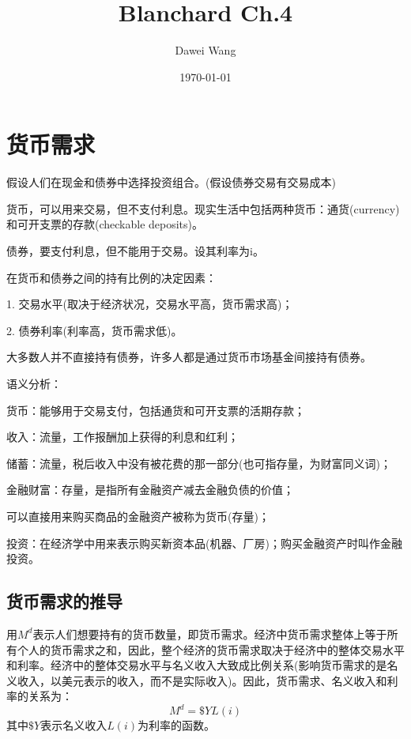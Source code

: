 \documentclass{article}
\title{Blanchard Ch.4}
\author{Dawei Wang}
\date{\today}
\begin{document}
	\maketitle
\section{货币需求}
假设人们在现金和债券中选择投资组合。(假设债券交易有交易成本)
\hspace*{\fill}

货币，可以用来交易，但不支付利息。现实生活中包括两种货币：通货(currency)和可开支票的存款(checkable deposits)。

债券，要支付利息，但不能用于交易。设其利率为i。

\hspace*{\fill}

在货币和债券之间的持有比例的决定因素：

1. 交易水平(取决于经济状况，交易水平高，货币需求高)；

2. 债券利率(利率高，货币需求低)。

\hspace*{\fill}

大多数人并不直接持有债券，许多人都是通过货币市场基金间接持有债券。

\hspace*{\fill}

语义分析：

货币：能够用于交易支付，包括通货和可开支票的活期存款；

收入：流量，工作报酬加上获得的利息和红利；

储蓄：流量，税后收入中没有被花费的那一部分(也可指存量，为财富同义词)；

金融财富：存量，是指所有金融资产减去金融负债的价值；

可以直接用来购买商品的金融资产被称为货币(存量)；

投资：在经济学中用来表示购买新资本品(机器、厂房)；购买金融资产时叫作金融投资。

\subsection{货币需求的推导}
用$ M^d $表示人们想要持有的货币数量，即货币需求。经济中货币需求整体上等于所有个人的货币需求之和，因此，整个经济的货币需求取决于经济中的整体交易水平和利率。经济中的整体交易水平与名义收入大致成比例关系(影响货币需求的是名义收入，以美元表示的收入，而不是实际收入)。因此，货币需求、名义收入和利率的关系为：
\[
M^d=\$YL(i)
\]
其中$ \$Y $表示名义收入$ L(i) $为利率的函数。
\end{document}
